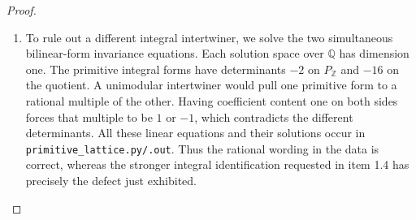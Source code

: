 \documentclass[11pt,a4paper]{article}
\theoremstyle{definition}
\begin{document}
\begin{proof}
\begin{enumerate}[label=\arabic*.]
\item To rule out a different integral intertwiner, we solve the two
simultaneous bilinear-form invariance equations.  Each solution space
over $\mathbb Q$ has dimension one.  The primitive integral forms have
determinants $-2$ on $P_{\mathbb Z}$ and $-16$ on the quotient.
A unimodular intertwiner would pull one primitive form to a rational
multiple of the other.  Having coefficient content one on both sides
forces that multiple to be $1$ or $-1$, which contradicts the different
determinants.  All these linear equations and their solutions occur in
\texttt{primitive\_lattice.py/.out}.  Thus the rational wording in the
data is correct, whereas the stronger integral identification requested
in item 1.4 has precisely the defect just exhibited.

\end{enumerate}
\end{proof}
\end{document}

